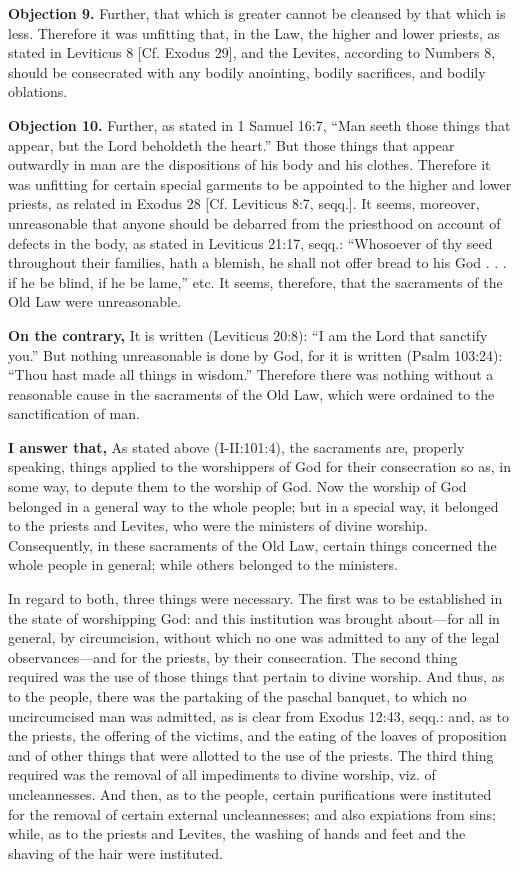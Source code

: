 \textbf{Objection 9.} Further, that which is greater cannot be cleansed by that which is less. Therefore it was unfitting that, in the Law, the higher and lower priests, as stated in Leviticus 8 [Cf. Exodus 29], and the Levites, according to Numbers 8, should be consecrated with any bodily anointing, bodily sacrifices, and bodily oblations.

\textbf{Objection 10.} Further, as stated in 1 Samuel 16:7, ``Man seeth those things that appear, but the Lord beholdeth the heart.'' But those things that appear outwardly in man are the dispositions of his body and his clothes. Therefore it was unfitting for certain special garments to be appointed to the higher and lower priests, as related in Exodus 28 [Cf. Leviticus 8:7, seqq.]. It seems, moreover, unreasonable that anyone should be debarred from the priesthood on account of defects in the body, as stated in Leviticus 21:17, seqq.: ``Whosoever of thy seed throughout their families, hath a blemish, he shall not offer bread to his God . . . if he be blind, if he be lame,'' etc. It seems, therefore, that the sacraments of the Old Law were unreasonable.

\textbf{On the contrary,} It is written (Leviticus 20:8): ``I am the Lord that sanctify you.'' But nothing unreasonable is done by God, for it is written (Psalm 103:24): ``Thou hast made all things in wisdom.'' Therefore there was nothing without a reasonable cause in the sacraments of the Old Law, which were ordained to the sanctification of man.

\textbf{I answer that,} As stated above (I-II:101:4), the sacraments are, properly speaking, things applied to the worshippers of God for their consecration so as, in some way, to depute them to the worship of God. Now the worship of God belonged in a general way to the whole people; but in a special way, it belonged to the priests and Levites, who were the ministers of divine worship. Consequently, in these sacraments of the Old Law, certain things concerned the whole people in general; while others belonged to the ministers.

In regard to both, three things were necessary. The first was to be established in the state of worshipping God: and this institution was brought about—for all in general, by circumcision, without which no one was admitted to any of the legal observances—and for the priests, by their consecration. The second thing required was the use of those things that pertain to divine worship. And thus, as to the people, there was the partaking of the paschal banquet, to which no uncircumcised man was admitted, as is clear from Exodus 12:43, seqq.: and, as to the priests, the offering of the victims, and the eating of the loaves of proposition and of other things that were allotted to the use of the priests. The third thing required was the removal of all impediments to divine worship, viz. of uncleannesses. And then, as to the people, certain purifications were instituted for the removal of certain external uncleannesses; and also expiations from sins; while, as to the priests and Levites, the washing of hands and feet and the shaving of the hair were instituted.

